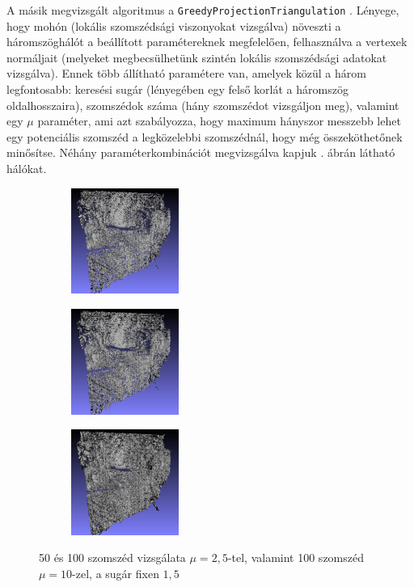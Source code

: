 \documentclass[a4paper,oneside]{article}
\begin{document}
A másik megvizsgált algoritmus a \texttt{GreedyProjectionTriangulation} \cite{greedy}. Lényege, hogy mohón (lokális szomszédsági viszonyokat vizsgálva) növeszti a háromszöghálót a beállított paramétereknek megfelelően, felhasználva a vertexek normáljait (melyeket megbecsülhetünk szintén lokális szomszédsági adatokat vizsgálva). Ennek több állítható paramétere van, amelyek közül a három legfontosabb: keresési sugár (lényegében egy felső korlát a háromszög oldalhosszaira), szomszédok száma (hány szomszédot vizsgáljon meg), valamint egy $\mu$ paraméter, ami azt szabályozza, hogy maximum hányszor messzebb lehet egy potenciális szomszéd a legközelebbi szomszédnál, hogy még összeköthetőnek minősítse. Néhány paraméterkombinációt megvizsgálva kapjuk . ábrán látható hálókat.

\begin{figure}[tbh]
  \centering
  \begin{subfigure}[b]{.32\linewidth}
	\centering
	\includegraphics[width=100pt]{figs/greedy_50_2_5.png}
	\caption{\label{fig:greedy50}}
  \end{subfigure}%
  \begin{subfigure}[b]{.32\linewidth}
	\centering
	\includegraphics[width=100pt]{figs/greedy_100_2_5.png}
	\caption{\label{fig:greedy100_1}}
  \end{subfigure}%
  \begin{subfigure}[b]{.32\linewidth}
	\centering
	\includegraphics[width=100pt]{figs/greedy_100_10.png}
	\caption{\label{fig:greedy100_2}}
  \end{subfigure}%
\caption{50 és 100 szomszéd vizsgálata $\mu=2,5$-tel, valamint 100 szomszéd $\mu=10$-zel, a sugár fixen $1,5$ \label{fig:greedy}}
\end{figure}
\end{document}
